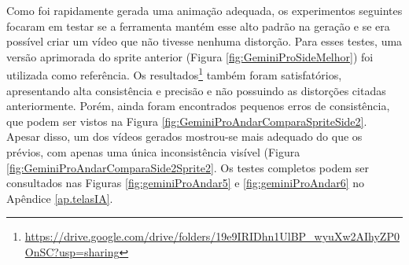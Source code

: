 Como foi rapidamente gerada uma animação adequada, os experimentos seguintes focaram em testar se a ferramenta mantém esse alto padrão na geração e se era possível criar um vídeo que não tivesse nenhuma distorção. Para esses testes, uma versão aprimorada do sprite anterior (Figura \ref{fig:GeminiProSideMelhor}) foi utilizada como referência. Os resultados\footnote{\url{https://drive.google.com/drive/folders/19e9IRIDhn1UlBP_wyuXw2AIhyZP0OnSC?usp=sharing}} também foram satisfatórios, apresentando alta consistência e precisão e não possuindo as distorções citadas anteriormente. Porém, ainda foram encontrados pequenos erros de consistência, que podem ser vistos na Figura \ref{fig:GeminiProAndarComparaSpriteSide2}. Apesar disso, um dos vídeos gerados mostrou-se mais adequado do que os prévios, com apenas uma única inconsistência visível (Figura \ref{fig:GeminiProAndarComparaSide2Sprite2}. Os testes completos podem ser consultados nas Figuras \ref{fig:geminiProAndar5} e \ref{fig:geminiProAndar6} no Apêndice \ref{ap.telasIA}. 


